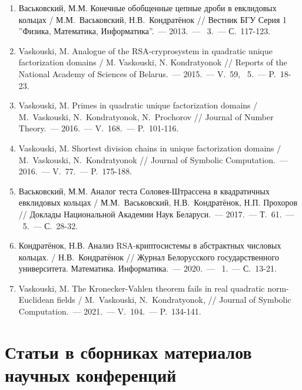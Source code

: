 \documentclass[_00_dissertation.tex]{subfiles}
\begin{document}
\begin{enumerate}

    \item \label{source:Vestnik_BSU_2013}
    Васьковский, М.М. Конечные обобщенные цепные дроби в евклидовых кольцах / М.М.~Васьковский, Н.В.~Кондратёнок // Вестник БГУ Серия 1 ''Физика, Математика, Информатика''.~--- 2013.~--- \textnumero~3.~--- С.~117-123.

    \item \label{source:NANB_2015}
    Vaskouski, M. Analogue of the RSA-cryprosystem in quadratic unique factorization domains / M. Vaskouski, N. Kondratyonok // Reports of the National Academy of Sciences of Belarus.~--- 2015.~--- V.~59, \textnumero~5.~--- P.~18-23.

    \item \label{source:JNT_2016}
    Vaskouski, M. Primes in quadratic unique factorization domains / M.~Vaskouski, N.~Kondratyonok, N.~Prochorov // Journal of Number Theory.~--- 2016.~--- V.~168.~--- P.~101-116.

    \item \label{source:JSC_2016}
    Vaskouski, M. Shortest division chains in unique factorization domains / M.~Vaskouski, N.~Kondratyonok // Journal of Symbolic Computation.~--- 2016.~--- V.~77.~--- P.~175-188.

    \item \label{source:NANB_2017}
    Васьковский, М.М. Аналог теста Соловея-Штрассена в квадратичных евклидовых кольцах / М.М.~Васьковский, Н.В.~Кондратёнок, Н.П. Прохоров // Доклады Национальной Академии Наук Беларуси.~--- 2017.~--- Т.~61.~--- \textnumero~5.~--- С.~28-32.

    \item \label{source:BSU_Journal_2020}
    Кондратёнок, Н.В. Анализ RSA-криптосистемы в абстрактных числовых кольцах. / Н.В.~Кондратёнок // Журнал Белорусского государственного университета. Математика. Информатика.~--- 2020.~--- \textnumero~1.~--- С.~13-21.

    \item \label{source:JSC_2021}
    Vaskouski, M. The Kronecker-Vahlen theorem fails in real quadratic norm-Euclidean fields / M.~Vaskouski, N.~Kondratyonok, // Journal of Symbolic Computation.~--- 2021.~--- V.~104.~--- P.~134-141.
\end{enumerate}

\vspace{-4ex}
\section*{\fontsize{14}{15}\selectfont Статьи в сборниках материалов научных конференций}
\vspace{-4ex}
\end{document}
